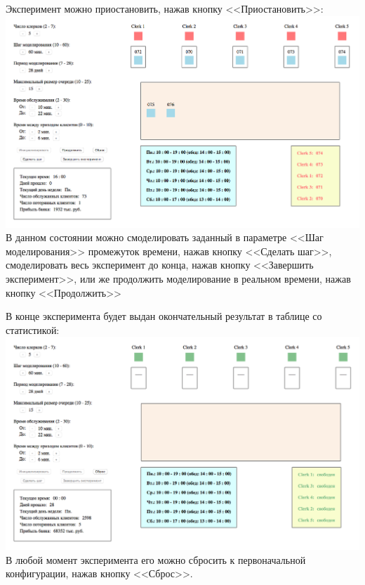\documentclass[oneside,final,12pt]{article}
\begin{document}
 \newpage
 
Эксперимент можно приостановить, нажав кнопку <<Приостановить>>:\\

 \includegraphics[width=150mm]{paused.png}\\

В данном состоянии можно смоделировать заданный в параметре <<Шаг моделирования>> промежуток времени, нажав кнопку <<Сделать шаг>>, смоделировать весь эксперимент до конца, нажав кнопку <<Завершить эксперимент>>, или же продолжить моделирование в реальном времени, нажав кнопку <<Продолжить>>\\

\newpage

В конце эксперимента будет выдан окончательный результат в таблице со статистикой:\\

 \includegraphics[width=150mm]{ended.png}\\

В любой момент эксперимента его можно сбросить к первоначальной конфигурации, нажав кнопку <<Сброс>>.\\

\newpage
\end{document}
